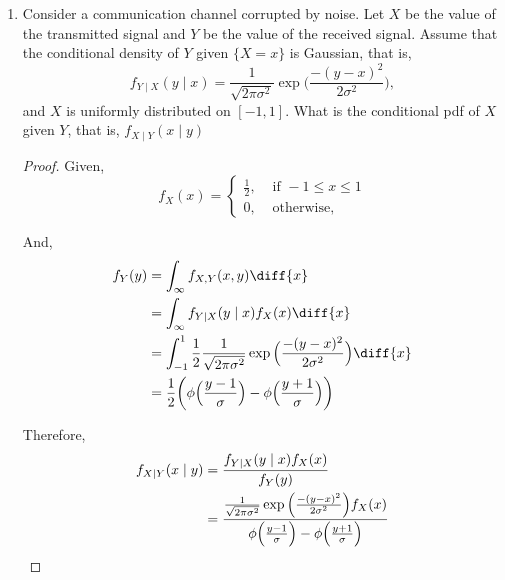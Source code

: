 \documentclass[paper=usletter, fontsize=12pt]{article}
\begin{document}
\begin{enumerate}
        \item Consider a communication channel corrupted by noise. Let $X$ be
        the value of the transmitted signal and $Y$ be the value of the
        received signal. Assume that the conditional density of $Y$ given
        $\{X=x\}$ is Gaussian, that is,
        \begin{equation*}
            f_{Y \mid X}(y \mid x) = \frac{1}{\sqrt{2\pi\sigma^2}}\exp\bigg(\frac{-(y-x)^2}{2\sigma^2}\bigg),
        \end{equation*}
        and $X$ is uniformly distributed on $[-1,1]$. What is the conditional
        pdf of $X$ given $Y$, that is, $f_{X \mid Y}(x \mid y)$
        \begin{proof}

            Given,
            \begin{equation*}
                f_{X}(x) =
                \begin{cases}
                    \frac{1}{2}, & \text{ if } -1 \le x \le 1\\
                    0, & \text{ otherwise},
                \end{cases}
            \end{equation*}

            And,
            \begin{align*}
                f_Y(y) & = \int_{\infty}f_{X,Y}(x,y)\diff{x}\\
                & = \int_{\infty}f_{Y \mid X}(y \mid x)f_X(x)\diff{x}\\
                & = \int_{-1}^{1}\frac{1}{2}\frac{1}{\sqrt{2\pi\sigma^2}}\exp\Big(\frac{-(y-x)^2}{2\sigma^2}\Big)\diff{x}\\
                & = \frac{1}{2}\bigg(\phi\Big(\frac{y-1}{\sigma}\Big)-\phi\Big(\frac{y+1}{\sigma}\Big)\bigg)
            \end{align*}
            \endgroup

            Therefore,
            \begin{align*}
                f_{X \mid Y}(x \mid y) & = \frac{f_{Y \mid X}(y \mid x)f_X(x)}{f_Y(y)}\\
                & = \frac{\frac{1}{\sqrt{2\pi\sigma^2}}\exp\Big(\frac{-(y-x)^2}{2\sigma^2}\Big)f_X(x)}{\phi\Big(\frac{y-1}{\sigma}\Big)-\phi\Big(\frac{y+1}{\sigma}\Big)} \qedhere
            \end{align*}
            \endgroup

        \end{proof}


\end{enumerate}
\end{document}
